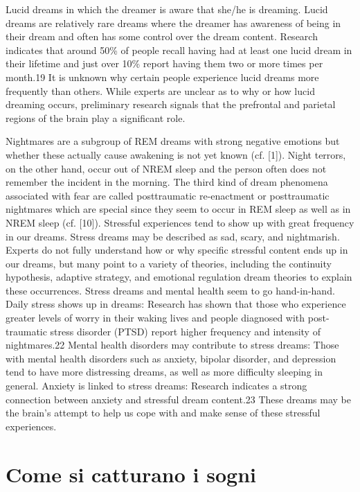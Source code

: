 Lucid dreams in which
the dreamer is aware that she/he is dreaming.
Lucid dreams are relatively rare dreams where the dreamer has awareness of being in their dream and often has some
control over the dream content.
Research indicates that around 50\% of people recall having had at least one lucid dream in their lifetime and just
over 10\% report having them two or more times per month.19
It is unknown why certain people experience lucid dreams more frequently than others.
While experts are unclear as to why or how lucid dreaming occurs, preliminary research signals that the prefrontal
and parietal regions of the brain play a significant role.

Nightmares are a subgroup of REM dreams
with strong negative emotions but whether these
actually cause awakening is not yet known (cf. [1]).
Night terrors, on the other hand, occur out of
NREM sleep and the person often does not remember
the incident in the morning. The third
kind of dream phenomena associated with fear
are called posttraumatic re-enactment or posttraumatic
nightmares which are special since
they seem to occur in REM sleep as well as in
NREM sleep (cf. [10]).
Stressful experiences tend to show up with great frequency in our dreams.
Stress dreams may be described as sad, scary, and nightmarish.
Experts do not fully understand how or why specific stressful content ends up in our dreams, but many point to a
variety of theories, including the continuity hypothesis, adaptive strategy, and emotional regulation dream theories
to explain these occurrences. Stress dreams and mental health seem to go hand-in-hand.
Daily stress shows up in dreams: Research has shown that those who experience greater levels of worry in their waking
lives and people diagnosed with post-traumatic stress disorder (PTSD) report higher frequency and intensity of
nightmares.22
Mental health disorders may contribute to stress dreams: Those with mental health disorders such as anxiety, bipolar
disorder, and depression tend to have more distressing dreams, as well as more difficulty sleeping in general.
Anxiety is linked to stress dreams: Research indicates a strong connection between anxiety and stressful dream
content.23 These dreams may be the brain's attempt to help us cope with and make sense of these stressful experiences.

\section{Come si catturano i sogni}

